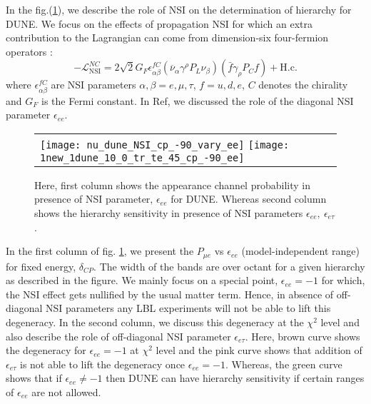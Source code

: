\documentclass{svproc}
\begin{document}
In the fig.(\ref{fig:nsi_dune}), we describe the role of  NSI on the determination of hierarchy for DUNE. We focus on the effects of propagation NSI for which an extra contribution to the Lagrangian can come from  dimension-six four-fermion operators :
\begin{equation}
  \label{eq:NSI}
 - \mathcal{L}^{NC}_\text{NSI} = 2\sqrt{2}G_F
   \epsilon^{fC}_{\alpha\beta}(\overline{\nu}_\alpha \gamma^{\rho} P_L \nu_\beta )
        ( \bar{f} \gamma_{\rho} P_C f ) + \text{H.c.}
\end{equation}
where $\epsilon^{f C}_{\alpha\beta}$ are NSI parameters $\alpha, \beta = e, \mu, \tau$, $f = u,d,e$, $C$ denotes the chirality and $ G_{F} $ is the Fermi constant.
In  Ref\cite{Deepthi:2016erc}, we discussed the role  of the diagonal NSI parameter $ \epsilon_{ee} $.
\begin{figure}
\vspace{-0.5cm}
        \begin{tabular}{lr}
               \hspace*{0.3in}
\texttt{[image: nu\_dune\_NSI\_cp\_-90\_vary\_ee]}
\hspace*{-0.6in}
\texttt{[image: 1new\_1dune\_10\_0\_tr\_te\_45\_cp\_-90\_ee]}
        \end{tabular}
\vspace{-0.4cm}
\caption{\footnotesize Here, first column shows the appearance channel probability in presence of NSI parameter, $ \epsilon_{ee} $ for DUNE.  Whereas second column shows the hierarchy sensitivity in presence of NSI parameters $ \epsilon_{ee},~ \epsilon_{e \tau}  $.}
\label{fig:nsi_dune}
\end{figure}
In the first column of fig. \ref{fig:nsi_dune}, we present the $ P_{\mu e} $ vs $\epsilon_{ee}  $ (model-independent range) for fixed energy, $ \delta_{CP} $. The width of the bands are over octant for a given hierarchy as described in the figure. We mainly focus on a special point, $\epsilon_{ee}=-1  $ for which, the NSI effect gets nullified by the usual matter term. Hence, in absence of off-diagonal NSI parameters any LBL experiments will not be able to lift this degeneracy. In the second column, we discuss this degeneracy at the $ \chi^{2} $ level and also describe the role of off-diagonal NSI parameter $ \epsilon_{e \tau} $. Here, brown curve shows  the  degeneracy for $\epsilon_{ee}=-1  $ at $ \chi^{2} $ level and  the pink curve  shows that addition of $ \epsilon_{e \tau} $ is not able to lift the degeneracy once $\epsilon_{ee}=-1  $. Whereas, the green curve shows that if $\epsilon_{ee}\neq-1 $ then DUNE can have hierarchy sensitivity if certain ranges of $\epsilon_{ee}  $ are not allowed.
%
\end{document}
